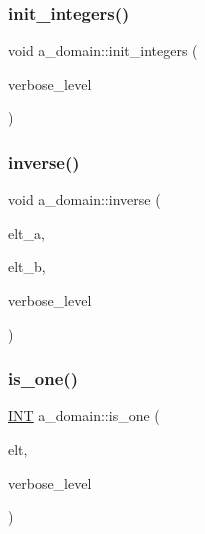 \subsubsection{\texorpdfstring{init\+\_\+integers()}{init\_integers()}}
{\footnotesize\ttfamily void a\+\_\+domain\+::init\+\_\+integers (\begin{DoxyParamCaption}\item[{\mbox{\hyperlink{galois_8h_a09fddde158a3a20bd2dcadb609de11dc}{I\+NT}}}]{verbose\+\_\+level }\end{DoxyParamCaption})}

\mbox{\label{classa__domain_aa5db8c2f149571c925fe7093ec2c87c6}} 
\subsubsection{\texorpdfstring{inverse()}{inverse()}}
{\footnotesize\ttfamily void a\+\_\+domain\+::inverse (\begin{DoxyParamCaption}\item[{\mbox{\hyperlink{galois_8h_a09fddde158a3a20bd2dcadb609de11dc}{I\+NT}} $\ast$}]{elt\+\_\+a,  }\item[{\mbox{\hyperlink{galois_8h_a09fddde158a3a20bd2dcadb609de11dc}{I\+NT}} $\ast$}]{elt\+\_\+b,  }\item[{\mbox{\hyperlink{galois_8h_a09fddde158a3a20bd2dcadb609de11dc}{I\+NT}}}]{verbose\+\_\+level }\end{DoxyParamCaption})}

\mbox{\label{classa__domain_a7d48682c853114a200f8f280f72bcce8}} 
\subsubsection{\texorpdfstring{is\+\_\+one()}{is\_one()}}
{\footnotesize\ttfamily \mbox{\hyperlink{galois_8h_a09fddde158a3a20bd2dcadb609de11dc}{I\+NT}} a\+\_\+domain\+::is\+\_\+one (\begin{DoxyParamCaption}\item[{\mbox{\hyperlink{galois_8h_a09fddde158a3a20bd2dcadb609de11dc}{I\+NT}} $\ast$}]{elt,  }\item[{\mbox{\hyperlink{galois_8h_a09fddde158a3a20bd2dcadb609de11dc}{I\+NT}}}]{verbose\+\_\+level }\end{DoxyParamCaption})}

